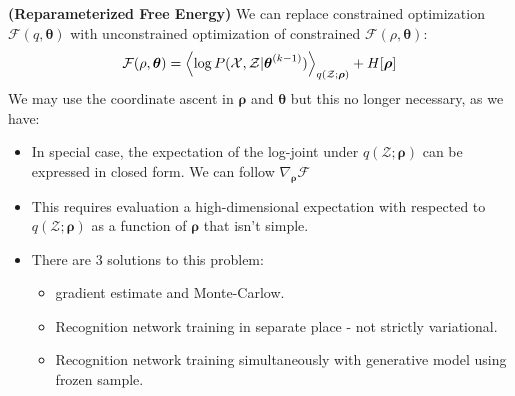 \begin{remark}{\textbf{(Reparameterized Free Energy)}}
    We can replace constrained optimization  $\mathcal{F}(q, \boldsymbol \theta)$ with unconstrained optimization of constrained $\mathcal{F}(\rho, \boldsymbol \theta)$:
    \begin{equation*}
        \mathcal{F}(\rho, \boldsymbol \theta) = \left\langle \log P(\mathcal{X}, \mathcal{Z} | \boldsymbol \theta^{(k-1)}) \right\rangle_{q(\mathcal{Z};\boldsymbol \rho)} + H[\boldsymbol \rho]
    \end{equation*}
    We may use the coordinate ascent in $\boldsymbol \rho$ and $\boldsymbol \theta$ but this no longer necessary, as we have:
    \begin{itemize}
        \item In special case, the expectation of the log-joint under $q(\mathcal{Z};\boldsymbol \rho)$ can be expressed in closed form. We can follow $\nabla_{\boldsymbol \rho}\mathcal{F}$
        \item This requires evaluation a high-dimensional expectation with respected to $q(\mathcal{Z};\boldsymbol \rho)$ as a function of $\boldsymbol \rho$ that isn't simple. 
        \item There are $3$ solutions to this problem:
        \begin{itemize}
            \item {} gradient estimate and Monte-Carlow. 
            \item Recognition network training in separate place - not strictly variational. 
            \item Recognition network training simultaneously with generative model using frozen sample. 
        \end{itemize}
    \end{itemize}
\end{remark}

